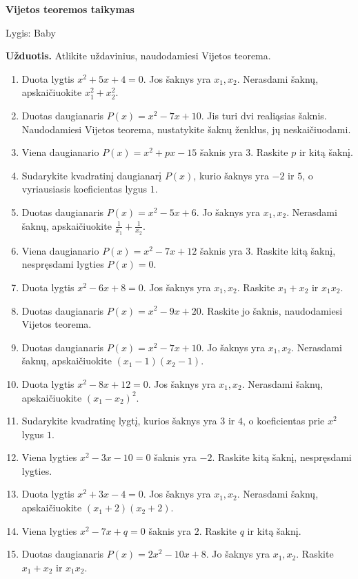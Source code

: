 \documentclass[11pt,a4paper]{article}
\begin{document}
\begin{center}
{\Large\bfseries Vijetos teoremos taikymas}

\medskip
{\large Lygis: Baby}
\end{center}
\textbf{Užduotis.} Atlikite uždavinius, naudodamiesi Vijetos teorema.
\medskip
\begin{enumerate}
\item Duota lygtis \(x^2+5x+4=0\). Jos šaknys yra \(x_1,x_2\). Nerasdami šaknų, apskaičiuokite \mbox{\(x_1^2+x_2^2\)}.
\item Duotas daugianaris \(P(x)=x^2-7x+10\). Jis turi dvi realiąsias šaknis. Naudodamiesi Vijetos teorema, nustatykite šaknų ženklus, jų neskaičiuodami.
\item Viena daugianario \(P(x)=x^2+px-15\) šaknis yra \(3\). Raskite \(p\) ir kitą šaknį.
\item Sudarykite kvadratinį daugianarį \(P(x)\), kurio šaknys yra \(-2\) ir \(5\), o vyriausiasis koeficientas lygus \(1\).
\item Duotas daugianaris \(P(x)=x^2-5x+6\). Jo šaknys yra \(x_1,x_2\). Nerasdami šaknų, apskaičiuokite \mbox{\(\frac1{x_1}+\frac1{x_2}\)}.
\item Viena daugianario \(P(x)=x^2-7x+12\) šaknis yra \(3\). Raskite kitą šaknį, nespręsdami lygties \(P(x)=0\).
\item Duota lygtis \(x^2-6x+8=0\). Jos šaknys yra \(x_1,x_2\). Raskite \(x_1+x_2\) ir \(x_1x_2\).
\item Duotas daugianaris \(P(x)=x^2-9x+20\). Raskite jo šaknis, naudodamiesi Vijetos teorema.
\item Duotas daugianaris \(P(x)=x^2-7x+10\). Jo šaknys yra \(x_1,x_2\). Nerasdami šaknų, apskaičiuokite \mbox{\((x_1-1)(x_2-1)\)}.
\item Duota lygtis \(x^2-8x+12=0\). Jos šaknys yra \(x_1,x_2\). Nerasdami šaknų, apskaičiuokite \mbox{\((x_1-x_2)^2\)}.
\item Sudarykite kvadratinę lygtį, kurios šaknys yra \(3\) ir \(4\), o koeficientas prie \(x^2\) lygus \(1\).
\item Viena lygties \(x^2-3x-10=0\) šaknis yra \(-2\). Raskite kitą šaknį, nespręsdami lygties.
\item Duota lygtis \(x^2+3x-4=0\). Jos šaknys yra \(x_1,x_2\). Nerasdami šaknų, apskaičiuokite \mbox{\((x_1+2)(x_2+2)\)}.
\item Viena lygties \(x^2-7x+q=0\) šaknis yra \(2\). Raskite \(q\) ir kitą šaknį.
\item Duotas daugianaris \(P(x)=2x^2-10x+8\). Jo šaknys yra \(x_1,x_2\). Raskite \(x_1+x_2\) ir \(x_1x_2\).

\end{enumerate}
\end{document}
